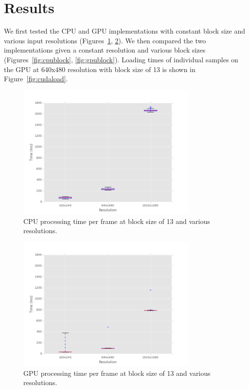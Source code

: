 \documentclass[12pt,letterpaper]{article}
\begin{document}
\section{Results}
We first tested the CPU and GPU implementations with constant block size and
various input resolutions (Figures~\ref{fig:cpures}, \ref{fig:gpures}). We then
compared the two implementations given a constant resolution and various block
sizes (Figures~\ref{fig:cpublock}, \ref{fig:gpublock}). Loading times of
individual samples on the GPU at 640x480 resolution with block size of 13 is
shown in Figure~\ref{fig:cudaload}.

\begin{figure}[H]
  \centering
    \includegraphics[width=0.8\textwidth]{img/cpu_resolution.png}
  \caption{CPU processing time per frame at block size of 13 and various resolutions.}
  \label{fig:cpures}
\end{figure}

\begin{figure}[H]
  \centering
    \includegraphics[width=0.8\textwidth]{img/gpu_resolution.png}
  \caption{GPU processing time per frame at block size of 13 and various resolutions.}
  \label{fig:gpures}
\end{figure}
\end{document}
